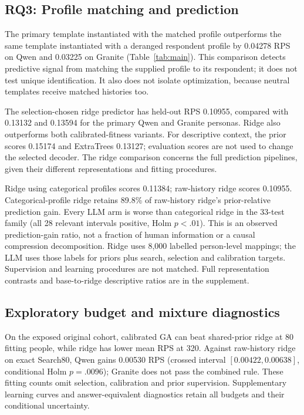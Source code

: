 \documentclass[sigconf,anonymous]{aamas}
\begin{document}
\subsection{RQ3: Profile matching and prediction}
The primary template instantiated with the matched profile outperforms
the same template instantiated with a deranged respondent profile by 0.04278 RPS on Qwen and 0.03225 on Granite (Table~\ref{tab:main}).
This comparison detects predictive signal from matching the supplied profile
to its respondent; it does not test unique identification. It also does not
isolate optimization, because neutral templates receive matched histories too.

The selection-chosen ridge predictor has held-out RPS 0.10955, compared with
0.13132 and 0.13594 for the primary Qwen and Granite personas. Ridge also
outperforms both calibrated-fitness variants. For descriptive context, the
prior scores 0.15174 and ExtraTrees 0.13127; evaluation scores are not used
to change the selected decoder. The ridge comparison concerns the full
prediction pipelines, given their different representations and fitting
procedures.

Ridge using categorical profiles scores 0.11384; raw-history ridge scores
0.10955. Categorical-profile ridge retains 89.8\% of raw-history ridge's
prior-relative prediction gain. Every LLM arm is
worse than categorical ridge in the 33-test family (all 28 relevant intervals
positive, Holm $p<.01$). This is an observed prediction-gain ratio, not a
fraction of human information or a causal compression decomposition.
Ridge uses 8,000 labelled person-level mappings; the LLM uses those labels
for priors plus search, selection and calibration targets. Supervision and
learning procedures are not matched. Full representation contrasts and
base-to-ridge descriptive ratios are in the supplement.

\subsection{Exploratory budget and mixture diagnostics}
On the exposed original cohort, calibrated GA can beat shared-prior ridge
at 80 fitting people, while ridge has lower mean RPS at 320. Against
raw-history ridge on exact Search80, Qwen gains 0.00530 RPS (crossed interval
$[0.00422,0.00638]$, conditional Holm $p=.0096$); Granite does not pass the
combined rule. These fitting counts omit selection, calibration and prior
supervision. Supplementary learning curves and answer-equivalent diagnostics
retain all budgets and their conditional uncertainty.
\end{document}
